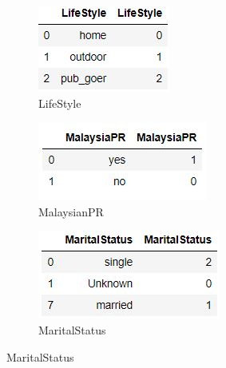 \documentclass[11pt]{article}
\begin{document}
\begin{figure}[H]
\begin{subfigure}{.5\textwidth}
  \centering
  \includegraphics[width=.6\linewidth]{LabelEncodingLifeStyle}
  \caption{LifeStyle}
  \label{fig:LabelEncodingEdu}
\end{subfigure}
\label{fig:test}

\centering
\begin{subfigure}{.5\textwidth}
  \centering
  \includegraphics[width=.7\linewidth]{LabelEncodingMalaysianPR} 
  \caption{MalaysianPR}
  \label{fig:LabelEncodingAddress}
\end{subfigure}%
\begin{subfigure}{.5\textwidth}
  \centering
  \includegraphics[width=.8\linewidth]{LabelEncodingMaritalStatus}
  \caption{MaritalStatus}
  \label{fig:LabelEncodingEdu}
\end{subfigure}
\label{fig:test}


\end{figure}
\end{document}
